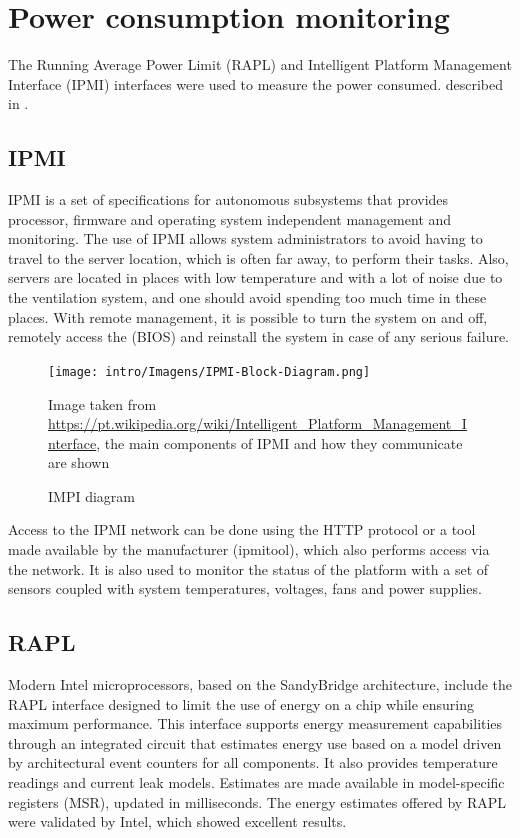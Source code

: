 \section {Power consumption monitoring} \label {sec: monitoring}
The Running Average Power Limit (RAPL) and Intelligent Platform Management Interface (IPMI) interfaces were used to measure the power consumed. described in \cite{November2013}.

\subsection {IPMI}
IPMI \cite {November2013} is a set of specifications for autonomous subsystems that provides processor, firmware and operating system independent management and monitoring. The use of IPMI allows system administrators to avoid having to travel to the server location, which is often far away, to perform their tasks. Also, servers are located in places with low temperature and with a lot of noise due to the ventilation system, and one should avoid spending too much time in these places. With remote management, it is possible to turn the system on and off, remotely access the (BIOS) and reinstall the system in case of any serious failure.

\begin {figure} [H]
\centering
\texttt{[image: intro/Imagens/IPMI-Block-Diagram.png]}
\caption {IMPI diagram} {Image taken from \protect \url {https://pt.wikipedia.org/wiki/Intelligent_Platform_Management_Interface}, the main components of IPMI and how they communicate are shown}
\label {fig: IPMI}
\end {figure}

Access to the IPMI network can be done using the HTTP protocol or a tool made available by the manufacturer (ipmitool), which also performs access via the network. It is also used to monitor the status of the platform with a set of sensors coupled with system temperatures, voltages, fans and power supplies.

\subsection {RAPL}

Modern Intel microprocessors, based on the SandyBridge architecture, include the RAPL \cite {Rotem2012, Hahnel2012, Hackenberg2015} interface designed to limit the use of energy on a chip while ensuring maximum performance. This interface supports energy measurement capabilities through an integrated circuit that estimates energy use based on a model driven by architectural event counters for all components. It also provides temperature readings and current leak models. Estimates are made available in model-specific registers (MSR), updated in milliseconds. The energy estimates offered by RAPL were validated by Intel, which showed excellent results.


